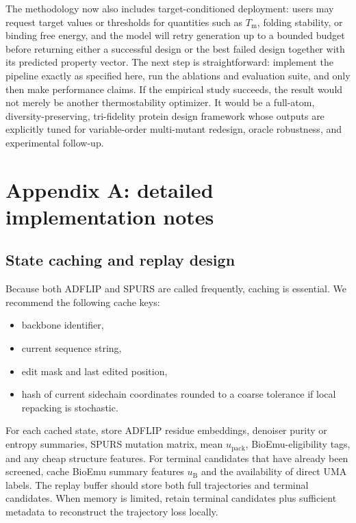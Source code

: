 \documentclass[11pt]{article}
\newcommand{\packunc}{\ensuremath{u_{\mathrm{pack}}}}
\newcommand{\Tm}{\ensuremath{T_{\mathrm m}}}
\begin{document}
The methodology now also includes target-conditioned deployment: users may request target values or thresholds for quantities such as $\Tm$, folding stability, or binding free energy, and the model will retry generation up to a bounded budget before returning either a successful design or the best failed design together with its predicted property vector. The next step is straightforward: implement the pipeline exactly as specified here, run the ablations and evaluation suite, and only then make performance claims. If the empirical study succeeds, the result would not merely be another thermostability optimizer. It would be a full-atom, diversity-preserving, tri-fidelity protein design framework whose outputs are explicitly tuned for variable-order multi-mutant redesign, oracle robustness, and experimental follow-up.

\appendix

\section{Appendix A: detailed implementation notes}

\subsection{State caching and replay design}

Because both ADFLIP and SPURS are called frequently, caching is essential. We recommend the following cache keys:
\begin{itemize}[leftmargin=1.5em]
    \item backbone identifier,
    \item current sequence string,
    \item edit mask and last edited position,
    \item hash of current sidechain coordinates rounded to a coarse tolerance if local repacking is stochastic.
\end{itemize}
For each cached state, store ADFLIP residue embeddings, denoiser purity or entropy summaries, SPURS mutation matrix, mean \packunc, BioEmu-eligibility tags, and any cheap structure features. For terminal candidates that have already been screened, cache BioEmu summary features $u_{\mathrm B}$ and the availability of direct UMA labels. The replay buffer should store both full trajectories and terminal candidates. When memory is limited, retain terminal candidates plus sufficient metadata to reconstruct the trajectory loss locally.
\end{document}
